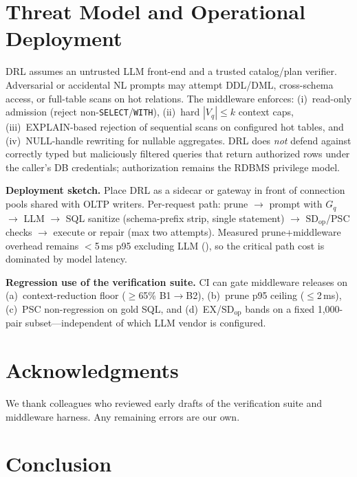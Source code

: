 \documentclass[twocolumn]{svjour3}
\begin{document}
\section{Threat Model and Operational Deployment}
\label{sec:deploy}

DRL assumes an untrusted LLM front-end and a trusted catalog/plan verifier.
Adversarial or accidental NL prompts may attempt DDL/DML, cross-schema access, or full-table scans on hot relations.
The middleware enforces: (i)~read-only admission (reject non-\texttt{SELECT}/\texttt{WITH}), (ii)~hard $|V_q|\le k$ context caps, (iii)~EXPLAIN-based rejection of sequential scans on configured hot tables, and (iv)~NULL-handle rewriting for nullable aggregates.
DRL does \emph{not} defend against correctly typed but maliciously filtered queries that return authorized rows under the caller's DB credentials; authorization remains the RDBMS privilege model.

\textbf{Deployment sketch.} Place DRL as a sidecar or gateway in front of connection pools shared with OLTP writers.
Per-request path: prune $\rightarrow$ prompt with $G_q$ $\rightarrow$ LLM $\rightarrow$ SQL sanitize (schema-prefix strip, single statement) $\rightarrow$ $\text{SD}_{\text{op}}$/PSC checks $\rightarrow$ execute or repair (max two attempts).
Measured prune+middleware overhead remains $<$5\,ms p95 excluding LLM (), so the critical path cost is dominated by model latency.

\textbf{Regression use of the verification suite.}
CI can gate middleware releases on (a)~context-reduction floor ($\ge$65\% B1$\rightarrow$B2), (b)~prune p95 ceiling ($\le$2\,ms), (c)~PSC non-regression on gold SQL, and (d)~EX/$\text{SD}_{\text{op}}$ bands on a fixed 1{,}000-pair subset---independent of which LLM vendor is configured.

\section*{Acknowledgments}
We thank colleagues who reviewed early drafts of the verification suite and middleware harness.
Any remaining errors are our own.

\section{Conclusion}
\label{sec:conclusion}
\end{document}
